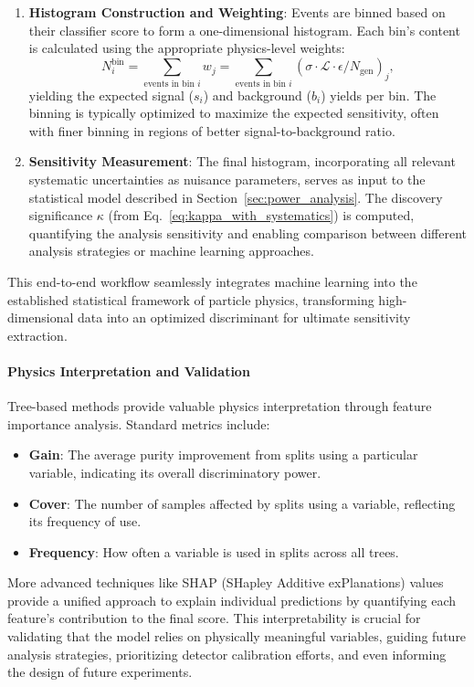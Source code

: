 \begin{enumerate}
    \item \textbf{Histogram Construction and Weighting}: Events are binned based on their classifier score to form a one-dimensional histogram. Each bin's content is calculated using the appropriate physics-level weights:
    \[
    N_i^{\text{bin}} = \sum_{\text{events in bin } i} w_j = \sum_{\text{events in bin } i} \left( \sigma \cdot \mathcal{L} \cdot \epsilon / N_{\text{gen}} \right)_j,
    \]
    yielding the expected signal ($s_i$) and background ($b_i$) yields per bin. The binning is typically optimized to maximize the expected sensitivity, often with finer binning in regions of better signal-to-background ratio.
    
    \item \textbf{Sensitivity Measurement}: The final histogram, incorporating all relevant systematic uncertainties as nuisance parameters, serves as input to the statistical model described in Section~\ref{sec:power_analysis}. The discovery significance $\kappa$ (from Eq.~\ref{eq:kappa_with_systematics}) is computed, quantifying the analysis sensitivity and enabling comparison between different analysis strategies or machine learning approaches.
\end{enumerate}

This end-to-end workflow seamlessly integrates machine learning into the established statistical framework of particle physics, transforming high-dimensional data into an optimized discriminant for ultimate sensitivity extraction.

\paragraph{Physics Interpretation and Validation}
Tree-based methods provide valuable physics interpretation through feature importance analysis. Standard metrics include:
\begin{itemize}
    \item \textbf{Gain}: The average purity improvement from splits using a particular variable, indicating its overall discriminatory power.
    \item \textbf{Cover}: The number of samples affected by splits using a variable, reflecting its frequency of use.
    \item \textbf{Frequency}: How often a variable is used in splits across all trees.
\end{itemize}
More advanced techniques like SHAP (SHapley Additive exPlanations) values provide a unified approach to explain individual predictions by quantifying each feature's contribution to the final score. This interpretability is crucial for validating that the model relies on physically meaningful variables, guiding future analysis strategies, prioritizing detector calibration efforts, and even informing the design of future experiments.


